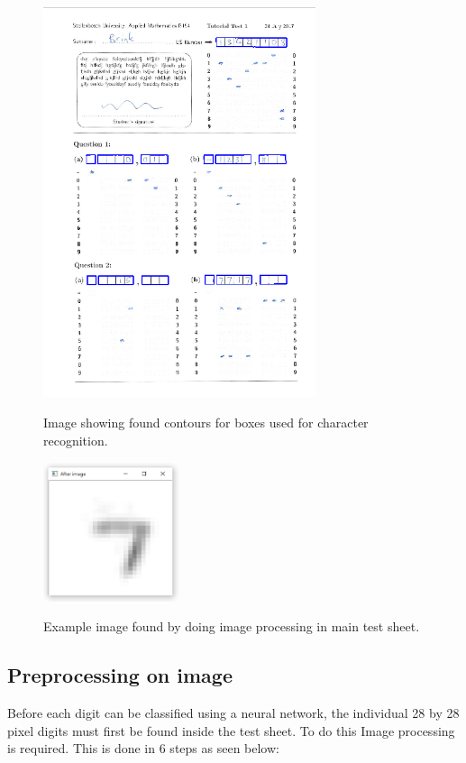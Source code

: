 \begin{figure}
  \centering
  \includegraphics[width=8cm]{DigitScan}\\
  \caption{Image showing found contours for boxes used for character recognition.}
  \label{fig:sa}
\end{figure}

\begin{figure}
  \centering
  \includegraphics[width=4cm]{TranslateAndScale}\\
  \caption{Example image found by doing image processing in main test sheet.}
  \label{fig:example}
\end{figure}

\subsection{Preprocessing on image}
\label{sec:preprocess}

Before each digit can be classified using a neural network, the individual 28 by 28 pixel digits must first be found inside the test sheet. To do this Image processing is required. This is done in 6 steps as seen below:

